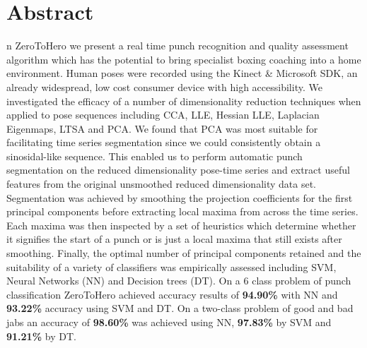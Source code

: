 %
%
%

\chapter*{Abstract}
\begin{SingleSpace}
n ZeroToHero we present a real time punch recognition and quality assessment algorithm which has the potential to bring specialist boxing coaching into a home environment. Human poses were recorded using the Kinect \& Microsoft SDK, an already widespread, low cost consumer device with high accessibility. 
We investigated the efficacy of a number of dimensionality reduction techniques when applied to pose sequences including CCA, LLE, Hessian LLE, Laplacian Eigenmaps, LTSA and PCA. We found that PCA was most suitable for facilitating time series segmentation since we could consistently obtain a sinosidal-like sequence. This enabled us to perform automatic punch segmentation on the reduced dimensionality pose-time series and extract useful features from the original unsmoothed reduced dimensionality data set. Segmentation was achieved by smoothing the projection coefficients for the first principal components before extracting local maxima from across the time series. Each maxima was then inspected by a set of heuristics which determine whether it signifies the start of a punch or is just a local maxima that still exists after smoothing.
Finally, the optimal number of principal components retained and the suitability of a variety of classifiers was empirically assessed including SVM, Neural Networks (NN) and Decision trees (DT). 
On a 6 class problem of punch classification ZeroToHero achieved accuracy results of {\bf 94.90\%} with NN and {\bf 93.22\%} accuracy using SVM and DT. On a two-class problem of good and bad jabs an accuracy of {\bf 98.60\%} was achieved using NN, {\bf 97.83\%} by SVM and {\bf 91.21\%} by DT.








\end{SingleSpace}
\clearpage